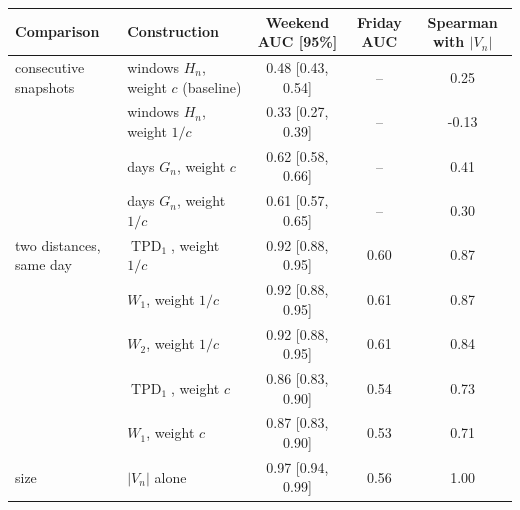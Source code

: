 \begin{tabular}{@{}llccc@{}}
\toprule
Comparison & Construction & Weekend AUC [95\%] & Friday AUC & Spearman with $|V_n|$\\
\midrule
consecutive snapshots & windows $H_n$, weight $c$ (baseline) & 0.48 [0.43, 0.54] & -- & 0.25\\
 & windows $H_n$, weight $1/c$ & 0.33 [0.27, 0.39] & -- & -0.13\\
 & days $G_n$, weight $c$ & 0.62 [0.58, 0.66] & -- & 0.41\\
 & days $G_n$, weight $1/c$ & 0.61 [0.57, 0.65] & -- & 0.30\\
\midrule
two distances, same day & $\operatorname{TPD}_1$, weight $1/c$ & 0.92 [0.88, 0.95] & 0.60 & 0.87\\
 & $W_1$, weight $1/c$ & 0.92 [0.88, 0.95] & 0.61 & 0.87\\
 & $W_2$, weight $1/c$ & 0.92 [0.88, 0.95] & 0.61 & 0.84\\
 & $\operatorname{TPD}_1$, weight $c$ & 0.86 [0.83, 0.90] & 0.54 & 0.73\\
 & $W_1$, weight $c$ & 0.87 [0.83, 0.90] & 0.53 & 0.71\\
\midrule
size & $|V_n|$ alone & 0.97 [0.94, 0.99] & 0.56 & 1.00\\
\bottomrule
\end{tabular}

